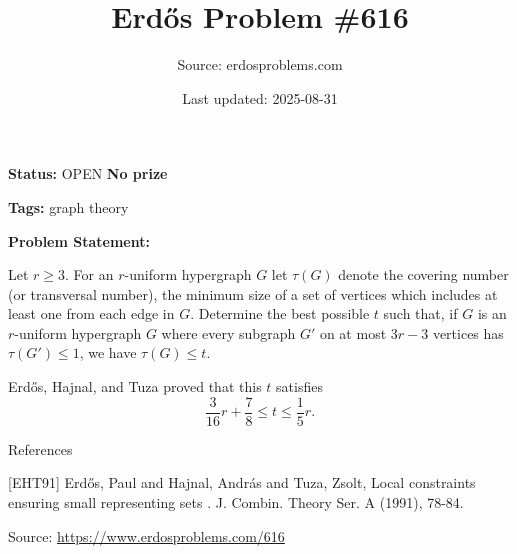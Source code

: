 \documentclass{article}
\title{Erd\H{o}s Problem \#616}
\date{Last updated: 2025-08-31}
\author{Source: erdosproblems.com}
\begin{document}
\maketitle

\noindent\textbf{Status:} OPEN \quad \textbf{No prize}

\noindent\textbf{Tags:} graph theory

\medskip

\noindent\textbf{Problem Statement:}

Let $r\geq 3$. For an $r$-uniform hypergraph $G$ let $\tau(G)$ denote the covering number (or transversal number), the minimum size of a set of vertices which includes at least one from each edge in $G$. Determine the best possible $t$ such that, if $G$ is an $r$-uniform hypergraph $G$ where every subgraph $G'$ on at most $3r-3$ vertices has $\tau(G')\leq 1$, we have $\tau(G)\leq t$.




Erd\H{o}s, Hajnal, and Tuza \cite{EHT91} proved that this $t$ satisfies\[\frac{3}{16}r+\frac{7}{8}\leq t \leq \frac{1}{5}r.\]




References

[EHT91] Erd\H{o}s, Paul and Hajnal, Andr\'{a}s and Tuza, Zsolt, Local constraints ensuring small representing sets . J. Combin. Theory Ser. A (1991), 78-84.


\bigskip
\noindent\small{Source: \url{https://www.erdosproblems.com/616}}
\end{document}
